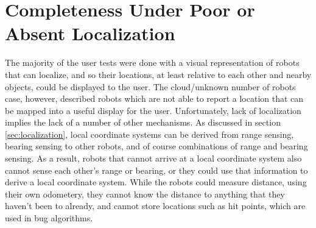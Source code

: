 %
% 		
%


\section{Completeness Under Poor or Absent Localization}

The majority of the user tests were done with a visual representation of robots that can localize, and so their locations, at least relative to each other and nearby objects, could be displayed to the user. 
The cloud/unknown number of robots case, however, described robots which are not able to report a location that can be mapped into a useful display for the user. 
Unfortunately, lack of localization implies the lack of a number of other mechanisms. 
As discussed in section \ref{sec:localization}, local coordinate systems can be derived from range sensing, bearing sensing to other robots, and of course combinations of range and bearing sensing. 
As a result, robots that cannot arrive at a local coordinate system also cannot sense each other's range or bearing, or they could use that information to derive a local coordinate system. 
While the robots could measure distance, using their own odometery, they cannot know the distance to anything that they haven't been to already, and cannot store locations such as hit points, which are used in bug algorithms. 

